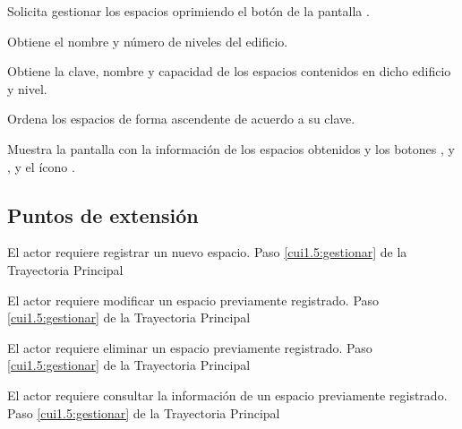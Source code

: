 \begin{UCtrayectoria}
	
	\UCpaso [\UCactor] Solicita gestionar los espacios oprimiendo el botón  de la pantalla .
	
	\UCpaso [\UCsist] Obtiene el nombre y número de niveles del edificio.
	
	\UCpaso [\UCsist] Obtiene la clave, nombre y capacidad de los espacios contenidos en dicho edificio y nivel.
	
	\UCpaso [\UCsist] Ordena los espacios de forma ascendente de acuerdo a su clave.
	
	\UCpaso[\UCsist] Muestra la pantalla  con la información de los espacios obtenidos y los botones ,  y , y el ícono \btnRegistrar. 
	\label{cui1.5:gestionar}
\end{UCtrayectoria}

\subsection{Puntos de extensión}

\UCExtensionPoint 
{El actor requiere registrar un nuevo espacio.}
{Paso \ref{cui1.5:gestionar} de la Trayectoria Principal}
{}

\UCExtensionPoint 
{El actor requiere modificar un espacio previamente registrado.}
{Paso \ref{cui1.5:gestionar} de la Trayectoria Principal}
{}

\UCExtensionPoint 
{El actor requiere eliminar un espacio previamente registrado.}
{Paso \ref{cui1.5:gestionar} de la Trayectoria Principal}
{}

\UCExtensionPoint 
{El actor requiere consultar la información de un espacio previamente registrado.}
{Paso \ref{cui1.5:gestionar} de la Trayectoria Principal}
{}


